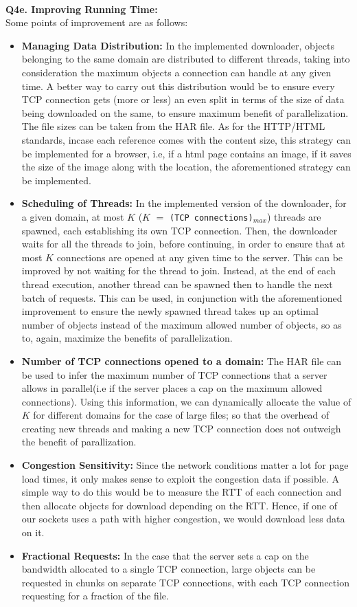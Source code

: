 \documentclass[12pt]{article}
\begin{document}
~\\
{\bfseries Q4e. Improving Running Time: }
\\ Some points of improvement are as follows:
\begin{itemize}
\item \textbf{Managing Data Distribution:} In the implemented downloader, objects belonging to the same domain are distributed to different threads, taking into consideration the maximum objects a connection can handle at any given time. A better way to carry out this distribution would be to ensure every TCP connection gets (more or less) an even split in terms of the size of data being downloaded on the same, to ensure maximum benefit of parallelization. The file sizes can be taken from the HAR file. As for the HTTP/HTML standards, incase each reference comes with the content size, this strategy can be implemented for a browser, i.e, if a html page contains an image, if it saves the size of the image along with the location, the aforementioned strategy can be implemented.
\item \textbf{Scheduling of Threads:} In the implemented version of the downloader, for a given domain, at most $K$ ($K$ $=$ \texttt{(TCP connections)$_{max}$}) threads are spawned, each establishing its own TCP connection. Then, the downloader waits for all the threads to join, before continuing, in order to ensure that at most $K$ connections are opened at any given time to the server. This can be improved by not waiting for the thread to join. Instead, at the end of each thread execution, another thread can be spawned then to handle the next batch of requests. This can be used, in conjunction with the aforementioned improvement to ensure the newly spawned thread takes up an optimal number of objects instead of the maximum allowed number of objects, so as to, again, maximize the benefits of parallelization.  
\item \textbf{Number of TCP connections opened to a domain:} The HAR file can be used to infer the maximum number of TCP connections that a server allows in parallel(i.e if the server places a cap on the maximum allowed connections). Using this information, we can dynamically allocate the value of $K$ for different domains for the case of large files; so that the overhead of creating new threads and making a new TCP connection does not outweigh the benefit of parallization. 
\item \textbf{Congestion Sensitivity:} Since the network conditions matter a lot for page load times, it only makes sense to exploit the congestion data if possible. A simple way to do this would be to measure the RTT of each connection and then allocate objects for download depending on the RTT. Hence, if one of our sockets uses a path with higher congestion, we would download less data on it.
\item \textbf{Fractional Requests:} In the case that the server sets a cap on the bandwidth allocated to a single TCP connection, large objects can be requested in chunks on separate TCP connections, with each TCP connection requesting for a fraction of the file.
\end{itemize}
\end{document}

